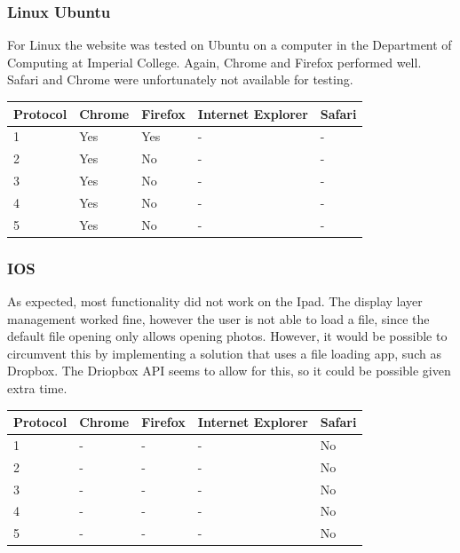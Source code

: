 \documentclass[a4paper,11pt,titlepage]{article}
\begin{document}
\subsubsection*{Linux Ubuntu}

For Linux the website was tested on Ubuntu on a computer in the Department of Computing at Imperial College. Again, Chrome and Firefox performed well. Safari and Chrome were unfortunately not available for testing.

\begin{center}

  \begin{tabular}{ | l || l | l | l | l |}
    \hline
    Protocol & Chrome & Firefox & Internet Explorer & Safari \\ \hline \hline
    1 & Yes & Yes  & -  & - \\ \hline
    2 & Yes & No & - & - \\ \hline
    3 & Yes & No & - & - \\ \hline
    4 & Yes & No & - & - \\ \hline
    5 & Yes & No & - & - \\
    \hline
  \end{tabular}

\end{center}


\subsubsection*{IOS}

As expected, most functionality did not work on the Ipad. The display layer management worked fine, however the user is not able to load a file, since the default file opening only allows opening photos. However, it would be possible to circumvent this by implementing a solution that uses a file loading app, such as Dropbox. The Driopbox API seems to allow for this, so it could be possible given extra time.

\begin{center}

  \begin{tabular}{ | l || l | l | l | l |}
    \hline
    Protocol & Chrome & Firefox & Internet Explorer & Safari \\ \hline \hline
    1 & - & -  & -  & No \\ \hline
    2 & - & - & - & No \\ \hline
    3 & - & - & - & No \\ \hline
    4 & - & - & - & No \\ \hline
    5 & - & - & - & No \\
    \hline
  \end{tabular}

\end{center}
\end{document}
